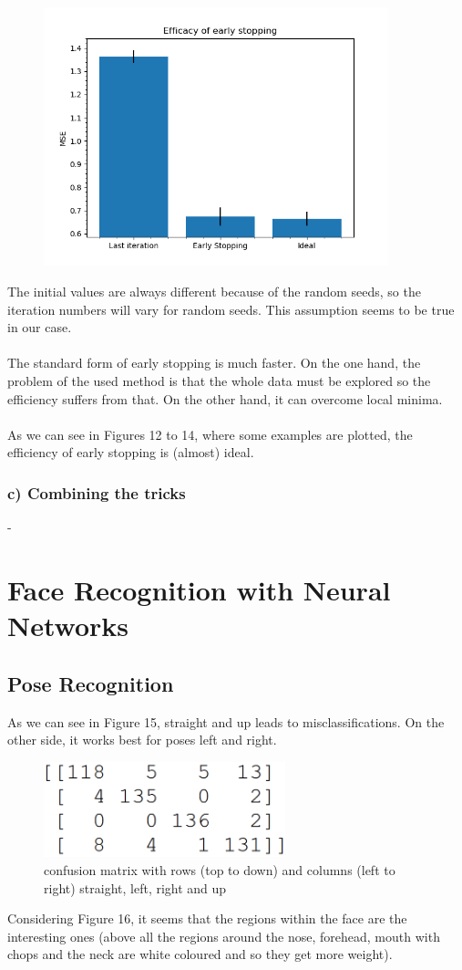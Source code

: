 \begin{figure}[!htbp]
	\centering
        \includegraphics[width=10cm]{1_2_b4}
	\caption{}
\end{figure}
The initial values are always different because of the random seeds, so the iteration numbers will vary for random seeds. This assumption seems to be true in our case.\\\\
The standard form of early stopping is much faster. On the one hand, the problem of the used method is that the whole data must be explored so the efficiency suffers from that. On the other hand, it can overcome local minima.\\\\
As we can see in Figures 12 to 14, where some examples are plotted, the efficiency of early stopping is (almost) ideal.
\newpage
\subsubsection*{c) Combining the tricks}
-

\section{Face Recognition with Neural Networks}

\subsection{Pose Recognition}

As we can see in Figure 15, straight and up leads to misclassifications. On the other side, it works best for poses left and right.
\begin{figure}[!htbp]
	\centering
        \includegraphics[width=7cm]{2_1_cfm}
	\caption{confusion matrix with rows (top to down) and columns (left to right) straight, left, right and up}
\end{figure}
\newpage
Considering Figure 16, it seems that the regions within the face are the interesting ones (above all the regions around the nose, forehead, mouth with chops and the neck are white coloured and so they get more weight).

